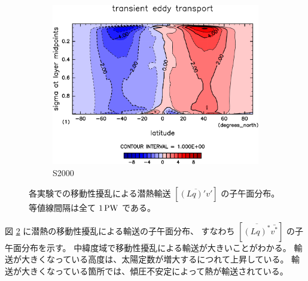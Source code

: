\documentclass[body]{subfiles}
\begin{document}
\begin{figure}[t]
\begin{subfigure}{.4\textwidth}
		\includegraphics[width=\columnwidth]{S2000/MeriHeatTransTest@latentEn_TE,time=7300:7665-crop-rotate.pdf}
		\caption{S2000}\label{潜熱移動性擾乱S2000}
	\end{subfigure}
	\caption[各実験での移動性擾乱による潜熱輸送の子午面分布]{
		各実験での移動性擾乱による潜熱輸送 \([\overline{(Lq)'v'}]\) の子午面分布。
		等値線間隔は全て \(1\hmu{PW}\) である。
	}\label{潜熱移動性擾乱}
\end{figure}

図 \ref{潜熱移動性擾乱} に潜熱の移動性擾乱による輸送の子午面分布、
すなわち \([\overline{(Lq)^*}\bar{v^*}]\) の子午面分布を示す。
中緯度域で移動性擾乱による輸送が大きいことがわかる。
輸送が大きくなっている高度は、太陽定数が増大するにつれて上昇している。
輸送が大きくなっている箇所では、傾圧不安定によって熱が輸送されている。
\end{document}
